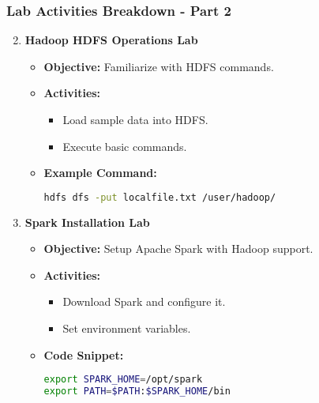 \documentclass[aspectratio=169]{beamer}
\begin{document}
\begin{frame}[fragile]
    \frametitle{Lab Activities Breakdown - Part 2}
    \begin{enumerate}
        \setcounter{enumi}{1}
        \item \textbf{Hadoop HDFS Operations Lab}
        \begin{itemize}
            \item \textbf{Objective:} Familiarize with HDFS commands.
            \item \textbf{Activities:}
            \begin{itemize}
                \item Load sample data into HDFS.
                \item Execute basic commands.
            \end{itemize}
            \item \textbf{Example Command:}
            \begin{lstlisting}[language=bash]
hdfs dfs -put localfile.txt /user/hadoop/
            \end{lstlisting}
        \end{itemize}
        
        \item \textbf{Spark Installation Lab}
        \begin{itemize}
            \item \textbf{Objective:} Setup Apache Spark with Hadoop support.
            \item \textbf{Activities:}
            \begin{itemize}
                \item Download Spark and configure it.
                \item Set environment variables.
            \end{itemize}
            \item \textbf{Code Snippet:}
            \begin{lstlisting}[language=bash]
export SPARK_HOME=/opt/spark
export PATH=$PATH:$SPARK_HOME/bin
            \end{lstlisting}
        \end{itemize}
    \end{enumerate}
\end{frame}
\end{document}

